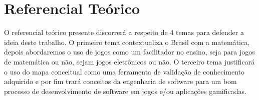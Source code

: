 \chapter[Referencial Teórico]{Referencial Teórico}
O referencial teórico presente discorrerá a respeito de 4 temas para defender a ideia deste trabalho. O primeiro tema contextualiza o Brasil com a matemática, depois abordaremos o uso de jogos como um facilitador no ensino, seja para jogos de matemática ou não, sejam jogos eletrônicos ou não. O terceiro tema justificará o uso do mapa conceitual como uma ferramenta de validação de conhecimento adquirido e por fim trará conceitos da engenharia de software para um bom processo de desenvolvimento de software em jogos e/ou aplicações gamificadas. 





\begin{comment}
Existem estudos com referencial teórico apoiando o uso de gamificação em vários contextos e utilizando dos benefícios oferecidos por ela. Exemplo de contextos como marketing, saúde, educação e etc. A gamificação é também utilizada em contextos de ensino de matemática (embora não sejam muitos os resultados encontrados para universidades). Em alguns casos são utilizados a tecnologia junto da gamificação nos contextos acima citado. É dito que a tecnologia e jogos contribuem para ajudar no engajamento e chamar atenção das pessoas e dos estudantes.
Tem um estudo dizendo que não há limites para a idade de jogar, brincar e se divertir. Por isso jogo e gamificação podem ser possíveis estratégias para utilizar em comunhão de tecnologias visando o ensino de EDO 1ª ordem para estudantes do ensino superior.
 
 \end{comment}




